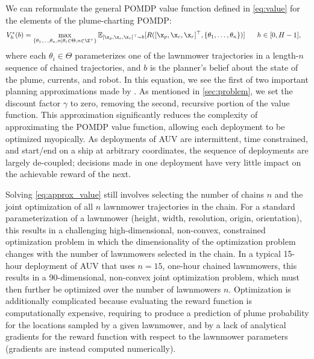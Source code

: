 We can reformulate the general POMDP value function defined in \cref{eq:value} for the elements of the plume-charting POMDP:
\begin{align}
     V_h^{*}(b) &=  \max_{\{\theta_1, \dots, \theta_n, n \mid \theta_i \in \Theta, n \in \Z^+\}} \mathbb{E}_{[\x_{p}, \x_{c}, \x_{r}]^\top \sim b}[R([\x_{p}, \x_{c}, \x_{r}]^\top, \{\theta_1, \dots, \theta_n\})] \hspace{0.6cm} h \in [0, H-1],
    \label{eq:approx_value}
\end{align}
where each $\theta_i \in \Theta$ parameterizes one of the lawnmower trajectories in a length-$n$ sequence of chained trajectories, and $b$ is the planner's belief about the state of the plume, currents, and robot. In this equation, we see the first of two important planning approximations made by \PHORTEX. As mentioned in \cref{sec:problem}, we set the discount factor $\gamma$ to zero, removing the second, recursive portion of the value function. This approximation significantly reduces the complexity of approximating the POMDP value function, allowing each deployment to be optimized myopically. As deployments of AUV \Sentry are intermittent, time constrained, and start/end on a ship at arbitrary coordinates, the sequence of deployments are largely de-coupled; decisions made in one deployment have very little impact on the achievable reward of the next.

Solving \cref{eq:approx_value} still involves selecting the number of chains $n$ and the joint optimization of all $n$ lawnmower trajectories in the chain. For a standard parameterization of a lawnmower (height, width, resolution, origin, orientation), this results in a challenging high-dimensional, non-convex, constrained optimization problem in which the dimensionality of the optimization problem changes with the number of lawnmowers selected in the chain. In a typical 15-hour deployment of AUV \Sentry that uses $n=15$, one-hour chained lawnmowers, this results in a 90-dimensional, non-convex joint optimization problem, which must then further be optimized over the number of lawnmowers $n$. Optimization is additionally complicated because evaluating the reward function is computationally expensive, requiring \PHUMES to produce a prediction of plume probability for the locations sampled by a given lawnmower, and by a lack of analytical gradients for the reward function with respect to the lawnmower parameters (gradients are instead computed numerically). 

